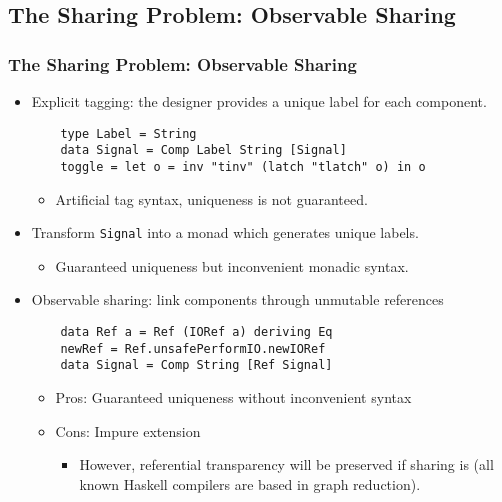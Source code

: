 \documentclass{beamer}
\begin{document}
\subsection{The Sharing Problem: Observable Sharing}
\begin{frame}[fragile]
  \frametitle{The Sharing Problem: Observable Sharing}
\vspace{-0.4cm}
  \begin{itemize}
  \item Explicit tagging: the designer provides a unique label for each
    component.
\begin{lstlisting}   
    type Label = String
    data Signal = Comp Label String [Signal]
    toggle = let o = inv "tinv" (latch "tlatch" o) in o      
\end{lstlisting}
    \begin{itemize}
      \pause
    \item Artificial tag syntax, uniqueness is not guaranteed.
    \end{itemize}
    \pause
  \item Transform \texttt{Signal} into a monad which generates 
    unique labels.
    \begin{itemize}
    \item Guaranteed uniqueness but inconvenient monadic syntax.
    \end{itemize}
    \pause
  \item Observable sharing: link components through unmutable references
\begin{lstlisting}   
    data Ref a = Ref (IORef a) deriving Eq
    newRef = Ref.unsafePerformIO.newIORef
    data Signal = Comp String [Ref Signal]      
\end{lstlisting}
    \begin{itemize}
      \pause
    \item Pros: Guaranteed uniqueness without inconvenient syntax
    \item Cons: Impure extension
      \begin{itemize}
        \pause
        \item However, referential transparency will be preserved if sharing is
          (all known Haskell compilers are based in graph reduction).
      \end{itemize}
    \end{itemize}
  \end{itemize}    
\end{frame}
\end{document}

